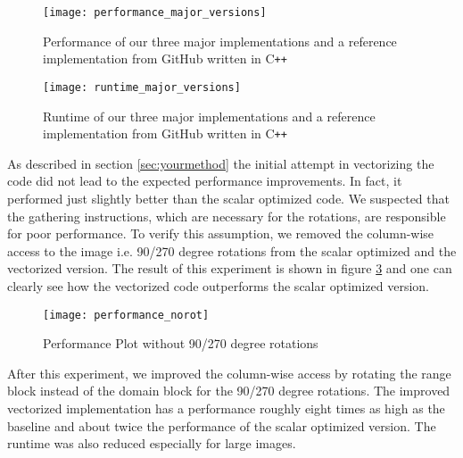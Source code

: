 \begin{figure}[H]
  \centering
  \texttt{[image: performance\_major\_versions]}
  \caption{Performance of our three major implementations and a reference
    implementation from GitHub written in C\texttt{++}}
  \label{fig:perf}
\end{figure}


\begin{figure}[H]
  \centering
  \texttt{[image: runtime\_major\_versions]}
  \caption{Runtime of our three major implementations and a reference
    implementation from GitHub written in C\texttt{++}}
  \label{fig:runtime}
\end{figure}

As described in section \ref{sec:yourmethod} the initial attempt in vectorizing
the code did not lead to the expected performance improvements. In fact, it
performed just slightly better than the scalar optimized code. We suspected that
the gathering instructions, which are necessary for the rotations, are
responsible for poor performance. To verify this assumption, we removed the
column-wise access to the image i.e. 90/270 degree rotations from the scalar
optimized and the vectorized version. The result of this experiment is shown in
figure \ref{fig:perf_40_41} and one can clearly see how the vectorized code
outperforms the scalar optimized version.

\begin{figure}[H]
  \centering
  \texttt{[image: performance\_norot]}
  \caption{Performance Plot without 90/270 degree rotations}
  \label{fig:perf_40_41}
\end{figure}


After this experiment, we improved the column-wise access by rotating the range
block instead of the domain block for the 90/270 degree rotations. The improved
vectorized implementation has a performance roughly eight times as high as the
baseline and about twice the performance of the scalar optimized version. The
runtime was also reduced especially for large images.
